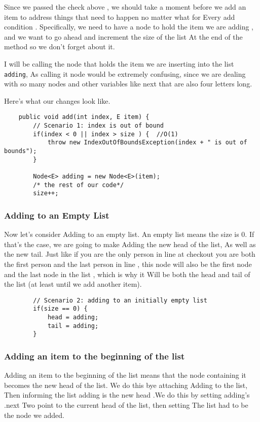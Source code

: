 Since we passed the check above , we should take a moment before we add an item to address things that need to happen no matter what for Every add condition . Specifically, we need to have a node to hold the item we are adding , and we want to go ahead and increment the size of the list At the end of the method so we don't forget about it.

I will be calling the node that holds the item we are inserting into the list \texttt{adding}, As calling it node would be extremely confusing, since we are dealing with so many nodes and other variables like next that are also four letters long.

Here's what our changes look like.

\begin{verbatim}
	public void add(int index, E item) {
		// Scenario 1: index is out of bound
		if(index < 0 || index > size ) {  //O(1)
			throw new IndexOutOfBoundsException(index + " is out of bounds");
		}
		
		Node<E> adding = new Node<E>(item);
		/* the rest of our code*/
		size++;
	\end{verbatim}
	
	
	
	\subsubsection{Adding to an Empty List}
	Now let's consider Adding to an empty list.  An empty list means the size is 0.  If that's the case, we are going to make Adding the new head of the list, As well as the new tail.  Just like if you are the only person in line at checkout you are both the first person and the last person in line , this node will also be the first node and the last node in the list , which is why it Will be both the head and tail of the list (at least until we add another item).
	
	\begin{verbatim}
		// Scenario 2: adding to an initially empty list
		if(size == 0) {
			head = adding;
			tail = adding;
		}	
	\end{verbatim}
	
	
	
	\subsubsection{Adding an item to the beginning of the list}
	Adding an item to the beginning of the list means that the node containing it becomes the new head of the list.  We do this bye attaching Adding to the list, Then informing the list adding is the new head .We do this by setting adding's .next Two point to the current head of the list, then setting The list had to be the node we added.
	
